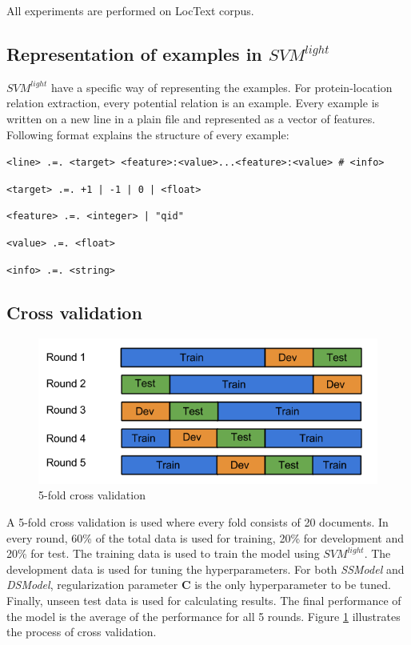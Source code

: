 All experiments are performed on LocText \cite{loctext} corpus.

\subsection{Representation of examples in $SVM^{light}$ }

$SVM^{light}$ \cite{joachims1999making} have a specific way of representing the examples. For protein-location relation extraction, every potential relation is an example. Every example is written on a new line in a plain file and represented as a vector of features. Following format explains the structure of every example:

\bigskip

\texttt{<line> .=. <target> <feature>:<value>...<feature>:<value> \# <info>}

\texttt{<target> .=. +1 | -1 | 0 | <float>}

\texttt{<feature> .=. <integer> | "qid"}

\texttt{<value> .=. <float>}

\texttt{<info> .=. <string>}

\subsection{Cross validation}

\begin{figure}
\centering
\includegraphics[scale=0.6]{figures/CrossValidation.png}
\caption{5-fold cross validation}\label{fig:crossVal}
\end{figure}

A 5-fold cross validation is used where every fold consists of 20 documents. In every round, 60\% of the total data is used for training, 20\% for development and 20\% for test. The training data is used to train the model using $SVM^{light}$. The development data is used for tuning the hyperparameters. For both \textit{SSModel} and \textit{DSModel}, regularization parameter $\mathbf{C}$ is the only hyperparameter to be tuned.  Finally, unseen test data is used for calculating results. The final performance of the model is the average of the performance for all 5 rounds. Figure \ref{fig:crossVal} illustrates the process of cross validation.

